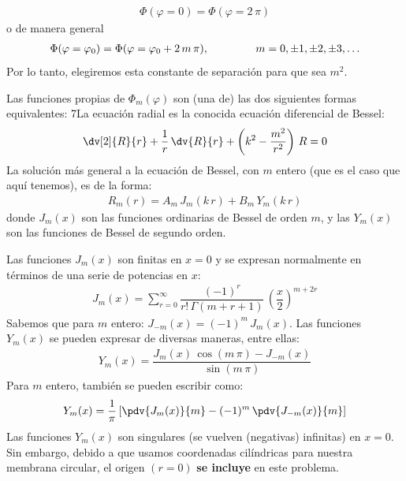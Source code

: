 \begin{align*}
\Phi (\varphi = 0) = \Phi (\varphi = 2 \, \pi)
\end{align*}
o de manera general
\begin{align*}
\Phi (\varphi = \varphi_{0}) = \Phi (\varphi = \varphi_{0} + 2 \, m \, \pi), \hspace{1.5cm} m = 0, \pm 1, \pm 2,\pm 3, \ldots
\end{align*}
Por lo tanto, elegiremos esta constante de separación para que sea $m^{2}$.
\par
Las funciones propias de $\Phi_{m} (\varphi)$ son (una de) las dos siguientes formas equivalentes:
7La ecuación radial es la conocida ecuación diferencial de Bessel:
\begin{align*}
\dv[2]{R}{r} + \dfrac{1}{r} \, \dv{R}{r} + \left( k^{2} - \dfrac{m^{2}}{r^{2}} \right) \, R = 0
\end{align*}
La solución más general a la ecuación de Bessel, con $m$ entero (que es el caso que aquí tenemos), es de la forma:
\begin{align*}
R_{m} (r) = A_{m} \, J_{m} (k \, r) + B_{m} \, Y_{m} (k \, r)
\end{align*}
donde $J_{m} (x)$ son las funciones ordinarias de Bessel de orden $m$, y las $Y_{m} (x)$ son las funciones de Bessel de segundo orden.
\par
Las funciones $J_{m} (x)$ son finitas en $x = 0$ y se expresan normalmente en términos de una serie de potencias en $x$:
\begin{align*}
J_{m} (x) = \sum_{r=0}^{\infty} \dfrac{(-1)^{r}}{r! \, \Gamma(m + r + 1)} \, \left( \dfrac{x}{2} \right)^{m+2r}
\end{align*}
Sabemos que para $m$ entero: $J_{-m}(x) = (-1)^{m} \, J_{m}(x)$. Las funciones $Y_{m}(x)$ se pueden expresar de diversas maneras, entre ellas:
\begin{align*}
Y_{m}(x) = \dfrac{J_{m}(x) \, \cos (m \, \pi) - J_{-m}(x)}{\sin (m \, \pi)}
\end{align*}
Para $m$ entero, también se pueden escribir como:
\begin{align*}
Y_{m}(x) = \dfrac{1}{\pi} \left[ \pdv{J_{m}(x)}{m} - (-1)^{m} \, \pdv{J_{-m}(x)}{m} \right]
\end{align*}
Las funciones $Y_{m} (x)$ son singulares (se vuelven (negativas) infinitas) en $x = 0$. Sin embargo, debido a que usamos coordenadas cilíndricas para nuestra membrana circular, el origen $(r = 0)$ \textbf{se incluye} en este problema.
\par
